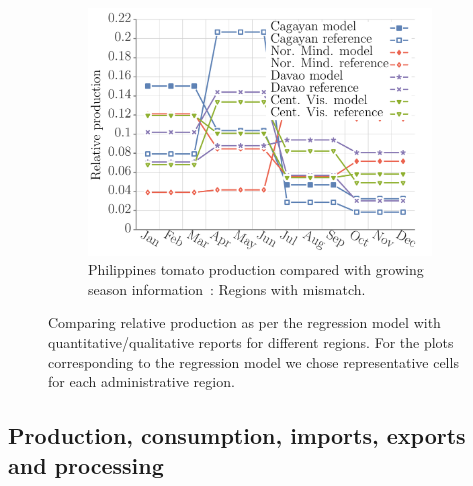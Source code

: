 \documentclass[10pt]{article}
\theoremstyle{definition}
\begin{document}
\begin{figure}[!ht]
\begin{subfigure}[b]{.32\textwidth}
\includegraphics[width=\textwidth]{../production/results/prod_tomato_PHL_exceptions.pdf}
\caption{Philippines tomato production compared with growing season
    information~\cite{psa2017}: Regions with mismatch.}
\end{subfigure}
\caption{Comparing relative production as per the regression model with
quantitative/qualitative reports for different regions. For the plots
corresponding to the
regression model we chose representative cells for each administrative
region.
\label{fig:seasonalProd}}
\end{figure}
%
\subsection{Production, consumption, imports, exports and processing}
\label{sec:locAttrib}
\end{document}
